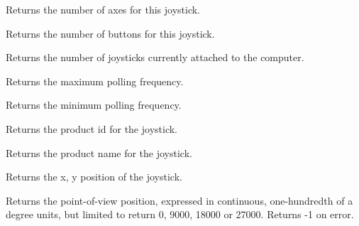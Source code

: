 \label{wxjoystickgetnumberaxes}


Returns the number of axes for this joystick.

\label{wxjoystickgetnumberbuttons}


Returns the number of buttons for this joystick.

\label{wxjoystickgetnumberjoysticks}


Returns the number of joysticks currently attached to the computer.

\label{wxjoystickgetpollingmax}


Returns the maximum polling frequency.

\label{wxjoystickgetpollingmin}


Returns the minimum polling frequency.

\label{wxjoystickgetproductid}


Returns the product id for the joystick.

\label{wxjoystickgetproductname}


Returns the product name for the joystick.

\label{wxjoystickgetposition}


Returns the x, y position of the joystick.

\label{wxjoystickgetpovposition}


Returns the point-of-view position, expressed in continuous, one-hundredth of a degree units,
but limited to return 0, 9000, 18000 or 27000.
Returns -1 on error.

